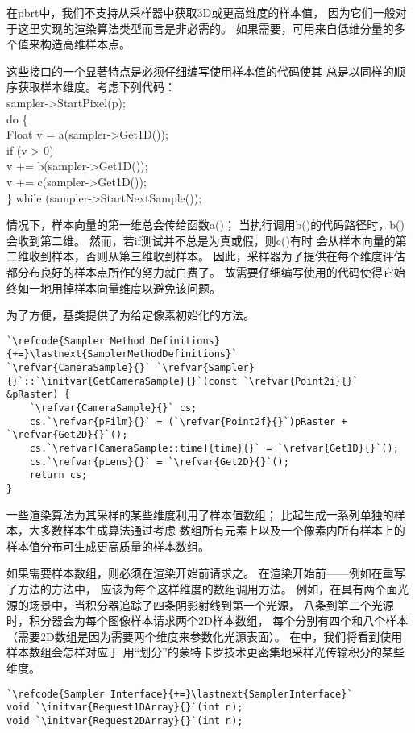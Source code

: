 在pbrt中，我们不支持从采样器中获取3D或更高维度的样本值，
因为它们一般对于这里实现的渲染算法类型而言是非必需的。
如果需要，可用来自低维分量的多个值来构造高维样本点。

这些接口的一个显著特点是必须仔细编写使用样本值的代码使其
总是以同样的顺序获取样本维度。考虑下列代码：\\
{\ttfamily
sampler->StartPixel(p);\\
do \{\\
\indent Float v = a(sampler->Get1D());\\
\indent if (v > 0)\\
\indent \indent v += b(sampler->Get1D());\\
\indent v += c(sampler->Get1D());\\
\} while (sampler->StartNextSample());
}

情况下，样本向量的第一维总会传给函数{\ttfamily a()}；
当执行调用{\ttfamily b()}的代码路径时，{\ttfamily b()}会收到第二维。
然而，若{\ttfamily if}测试并不总是为真或假，则{\ttfamily c()}有时
会从样本向量的第二维收到样本，否则从第三维收到样本。
因此，采样器为了提供在每个维度评估都分布良好的样本点所作的努力就白费了。
故需要仔细编写使用的代码使得它始终如一地用掉样本向量维度以避免该问题。

为了方便，基类提供了为给定像素初始化的方法。
\begin{lstlisting}
`\refcode{Sampler Method Definitions}{+=}\lastnext{SamplerMethodDefinitions}`
`\refvar{CameraSample}{}` `\refvar{Sampler}{}`::`\initvar{GetCameraSample}{}`(const `\refvar{Point2i}{}` &pRaster) {
    `\refvar{CameraSample}{}` cs;
    cs.`\refvar{pFilm}{}` = (`\refvar{Point2f}{}`)pRaster + `\refvar{Get2D}{}`();
    cs.`\refvar[CameraSample::time]{time}{}` = `\refvar{Get1D}{}`();
    cs.`\refvar{pLens}{}` = `\refvar{Get2D}{}`();
    return cs;
}
\end{lstlisting}

一些渲染算法为其采样的某些维度利用了样本值数组；
比起生成一系列单独的样本，大多数样本生成算法通过考虑
数组所有元素上以及一个像素内所有样本上的样本值分布可生成更高质量的样本数组。

如果需要样本数组，则必须在渲染开始前请求之。
在渲染开始前——例如在重写了方法的方法中，
应该为每个这样维度的数组调用方法。
例如，在具有两个面光源的场景中，当积分器追踪了四条阴影射线到第一个光源，
八条到第二个光源时，积分器会为每个图像样本请求两个2D样本数组，
每个分别有四个和八个样本（需要2D数组是因为需要两个维度来参数化光源表面）。
在中，我们将看到使用样本数组会怎样对应于
用“划分”的蒙特卡罗技术更密集地采样光传输积分的某些维度。
\begin{lstlisting}
`\refcode{Sampler Interface}{+=}\lastnext{SamplerInterface}`
void `\initvar{Request1DArray}{}`(int n);
void `\initvar{Request2DArray}{}`(int n);
\end{lstlisting}

